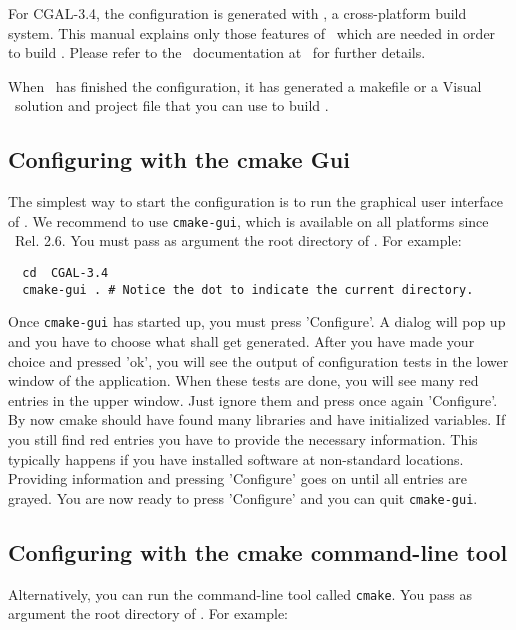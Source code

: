 For CGAL-3.4, the configuration is generated with \cmake, a
cross-platform build system.  This manual explains only those features of
\cmake\ which are needed in order to build \cgal. Please refer to the \cmake\ 
documentation at \cmakepage\ for further details.

When \cmake\ has finished the configuration, it has generated
a makefile or a Visual \CC\  solution and project file that you 
can use to build \cgal.

\subsection{Configuring \cgal{} with the cmake {\sc Gui} }

The simplest way to start the configuration is to run the graphical
user interface of \cmake. We recommend to use \texttt{cmake-gui}, which
is available on all platforms since \cmake\ Rel. 2.6.   You must pass as 
argument the root directory of \cgal. For example:

{\ccTexHtml{\scriptsize}{}
\begin{verbatim}
  cd  CGAL-3.4
  cmake-gui . # Notice the dot to indicate the current directory.
\end{verbatim}
}

Once \texttt{cmake-gui} has started up, you must press 'Configure'. 
A dialog will pop up and you have to choose what shall get generated.
After you have made your choice and pressed 'ok', you will see
the output of configuration tests in the lower window of the application. 
When these tests are done, you will see many
red entries in the upper window. Just ignore them and  press once again  'Configure'. 
By now cmake should have found many libraries and have initialized variables. 
If you still find red entries you have to provide the necessary information. 
This typically happens if you have installed software at non-standard locations.
Providing information and pressing 'Configure' goes on until 
all entries are grayed. You are now ready to press 'Configure' and you
can quit \texttt{cmake-gui}.

 

\subsection{Configuring \cgal{} with the cmake command-line tool }

Alternatively, you can run the command-line tool called
\texttt{cmake}. You pass as argument the root directory of
\cgal. For example:

